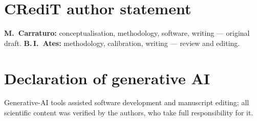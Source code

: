 \documentclass[preprint]{elsarticle}
\begin{document}
\section*{CRediT author statement}
\textbf{M.\ Carraturo:} conceptualisation, methodology, software, writing ---
original draft. \textbf{B.\,I.\ Ates:} methodology, calibration, writing ---
review and editing.

\section*{Declaration of generative AI}
Generative-AI tools assisted software development and manuscript editing; all
scientific content was verified by the authors, who take full responsibility
for it.



\end{document}
